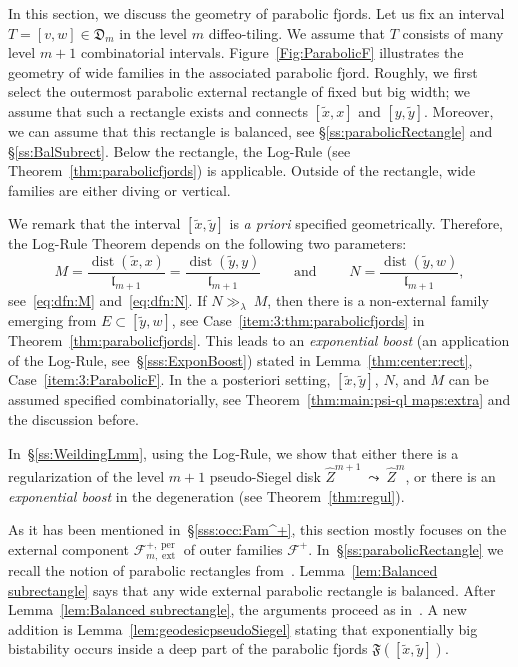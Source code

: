 \documentclass{amsart}
\newcommand{\1}{{\mathbb 1 }}
\newcommand{\ext}{{\operatorname{ext}}}
\newcommand{\Fam}{{\mathcal F}}
\newcommand{\wZ}{{\widehat Z}}
\newcommand{\length}{{\mathfrak l}}
\newcommand\per{{\operatorname{per}}}
\newcommand{\Dbb}{{\mathfrak{D}}}
\theoremstyle{remark}
\numberwithin{equation}{section}
\theoremstyle{definition}
\newcommand{\dist}{\operatorname{dist}}
\newcommand{\Fjord}{{\mathfrak F}}
\begin{document}
In this section, we discuss the geometry of parabolic fjords. Let us fix an interval $T=[v,w]\in \Dbb_m$ in the level $m$ diffeo-tiling. We assume that $T$ consists of many level $m+1$ combinatorial intervals. Figure~\ref {Fig:ParabolicF} illustrates the geometry of wide families in the associated parabolic fjord. Roughly, we first select the outermost parabolic external rectangle of fixed but big width; we assume that such a rectangle exists and connects $[\tilde x, x]$ and $[y,\tilde y]$. Moreover, we can assume that this rectangle is balanced, see \S \ref{ss:parabolicRectangle} and \S \ref{ss:BalSubrect}. Below the rectangle, the Log-Rule (see Theorem~\ref{thm:parabolicfjords}) is applicable. Outside of the rectangle, wide families are either diving or vertical.  


We remark that the interval $[\tilde x,\tilde y]$ is \emph{a priori} specified geometrically. Therefore, the Log-Rule Theorem depends on the following two parameters: \[M=\frac{\dist(\tilde x, x)}{\length_{m+1}}=\frac{\dist(\tilde y, y)}{\length_{m+1}} \qquad \text{ and }\qquad N=\frac{\dist(\tilde y, w)}{\length_{m+1}}, \] see~\eqref{eq:dfn:M} and~\eqref{eq:dfn:N}. If $N\gg_{\lambda}\ M$, then there is a non-external family emerging from $E\subset [\tilde y, w]$, see Case~\ref{item:3:thm:parabolicfjords} in Theorem~\ref{thm:parabolicfjords}. This leads to an \emph{exponential boost} (an application of the Log-Rule, see~\S\ref{sss:ExponBoost}) stated in Lemma~\ref{thm:center:rect}, Case~\ref{item:3:ParabolicF}. In the a posteriori setting, $[\tilde x, \tilde y]$, $N$, and $M$ can be assumed specified combinatorially, see Theorem~\ref{thm:main:psi-ql maps:extra} and the discussion before.

 In~\S\ref{ss:WeildingLmm}, using the Log-Rule, we show that either there is a regularization of the level $m+1$ pseudo-Siegel disk $\wZ^{m+1}\ \leadsto \ \wZ^{m}$, or there is an {\em exponential boost} in the degeneration (see Theorem~\ref{thm:regul}).

 As it has been mentioned in~\S\ref{sss:occ:Fam^+}, this section mostly focuses on the external component $\Fam^{+,\per}_{m,\ext}$ of outer families $\Fam^+$. In~\S\ref{ss:parabolicRectangle} we recall the notion of parabolic rectangles from~\cite{DL22}.  Lemma~\ref{lem:Balanced subrectangle} says that any wide external parabolic rectangle is balanced. After Lemma~\ref{lem:Balanced subrectangle}, the arguments proceed as in~\cite{DL22}. A new addition is Lemma~\ref{lem:geodesicpseudoSiegel} stating that exponentially big bistability occurs inside a deep part of the parabolic fjords $\Fjord([\tilde x, \tilde y])$.
\end{document}
